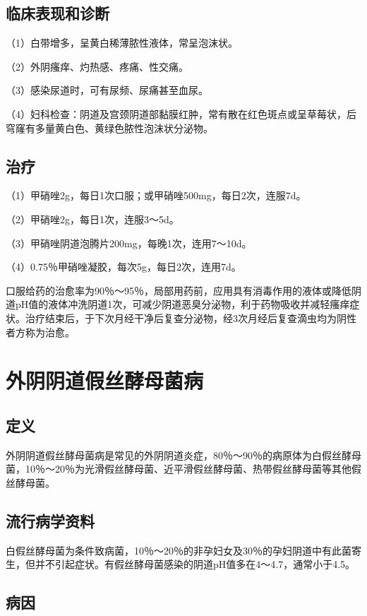 \subsection{临床表现和诊断}

（1）白带增多，呈黄白稀薄脓性液体，常呈泡沫状。

（2）外阴瘙痒、灼热感、疼痛、性交痛。

（3）感染尿道时，可有尿频、尿痛甚至血尿。

（4）妇科检查：阴道及宫颈阴道部黏膜红肿，常有散在红色斑点或呈草莓状，后穹窿有多量黄白色、黄绿色脓性泡沫状分泌物。

\subsection{治疗}

（1）甲硝唑2g，每日1次口服；或甲硝唑500mg，每日2次，连服7d。

（2）甲硝唑2g，每日1次，连服3～5d。

（3）甲硝唑阴道泡腾片200mg，每晚1次，连用7～10d。

（4）0.75％甲硝唑凝胶，每次5g，每日2次，连用7d。

口服给药的治愈率为90％～95％，局部用药前，应用具有消毒作用的液体或降低阴道pH值的液体冲洗阴道1次，可减少阴道恶臭分泌物，利于药物吸收并减轻瘙痒症状。治疗结束后，于下次月经干净后复查分泌物，经3次月经后复查滴虫均为阴性者方称为治愈。

\section{外阴阴道假丝酵母菌病}

\subsection{定义}

外阴阴道假丝酵母菌病是常见的外阴阴道炎症，80％～90％的病原体为白假丝酵母菌，10％～20％为光滑假丝酵母菌、近平滑假丝酵母菌、热带假丝酵母菌等其他假丝酵母菌。

\subsection{流行病学资料}

白假丝酵母菌为条件致病菌，10％～20％的非孕妇女及30％的孕妇阴道中有此菌寄生，但并不引起症状。有假丝酵母菌感染的阴道pH值多在4～4.7，通常小于4.5。

\subsection{病因}

